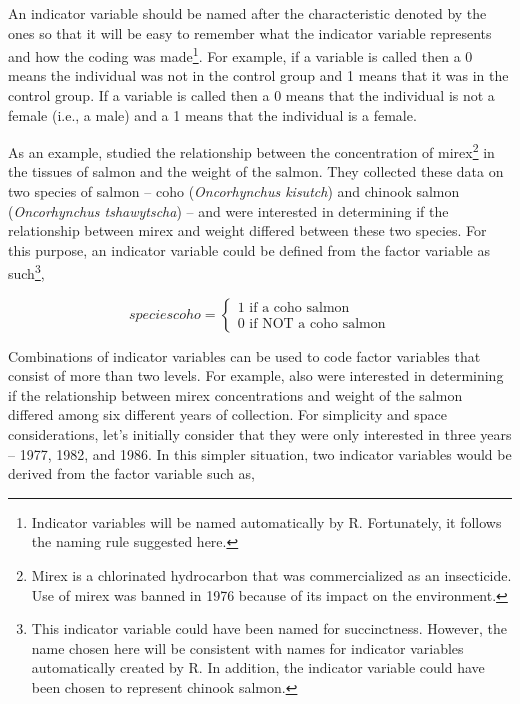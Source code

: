 \documentclass[10pt,openany]{book}\usepackage[]{graphicx}\usepackage[]{color}
\begin{document}
An indicator variable should be named after the characteristic denoted by the ones so that it will be easy to remember what the indicator variable represents and how the coding was made\footnote{Indicator variables will be named automatically by R.  Fortunately, it follows the naming rule suggested here.}.  For example, if a variable is called  then a 0 means the individual was not in the control group and 1 means that it was in the control group.  If a variable is called  then a 0 means that the individual is not a female (i.e., a male) and a 1 means that the individual is a female.


As an example, \cite{Makarewicz2003} studied the relationship between the concentration of mirex\footnote{Mirex is a chlorinated hydrocarbon that was commercialized as an insecticide.  Use of mirex was banned in 1976 because of its impact on the environment.} in the tissues of salmon and the weight of the salmon.  They collected these data on two species of salmon -- coho (\emph{Oncorhynchus kisutch}) and chinook salmon (\emph{Oncorhynchus tshawytscha}) -- and were interested in determining if the relationship between mirex and weight differed between these two species.  For this purpose, an indicator variable could be defined from the  factor variable as such\footnote{This indicator variable could have been named  for succinctness.  However, the name chosen here will be consistent with names for indicator variables automatically created by R.  In addition, the indicator variable could have been chosen to represent chinook salmon.},

\[
  speciescoho = \left\{\begin{array}{l}
  1 \text{ if a coho salmon }\\
  0 \text{ if NOT a coho salmon}
  \end{array}  \right.
\]

Combinations of indicator variables can be used to code factor variables that consist of more than two levels.  For example, \cite{Makarewicz2003} also were interested in determining if the relationship between mirex concentrations and weight of the salmon differed among six different years of collection.  For simplicity and space considerations, let's initially consider that they were only interested in three years -- 1977, 1982, and 1986.  In this simpler situation, two indicator variables would be derived from the  factor variable such as,
\end{document}
